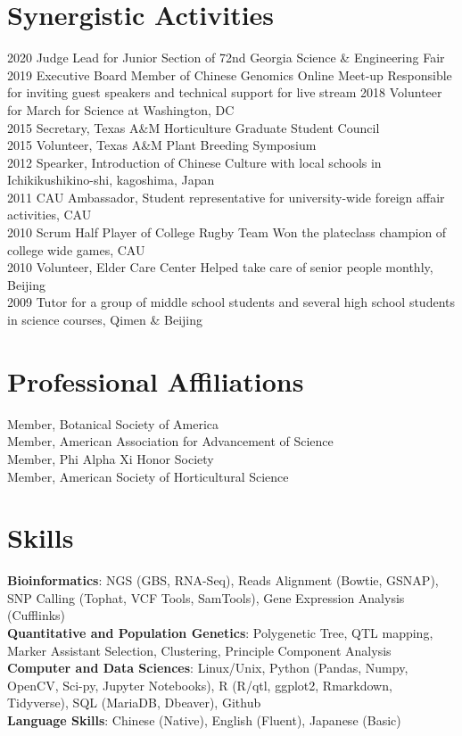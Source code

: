\documentclass[11pt, a4paper]{awesome-cv}
\begin{document}
\section{Synergistic Activities}\label{synergistic-activities}

2020 Judge Lead for Junior Section of 72nd Georgia Science \&
Engineering Fair\\
2019 Executive Board Member of Chinese Genomics Online Meet-up
\textbar{} Responsible for inviting guest speakers and technical support
for live stream 2018 Volunteer for March for Science at Washington, DC\\
2015 Secretary, Texas A\&M Horticulture Graduate Student Council\\
2015 Volunteer, Texas A\&M Plant Breeding Symposium\\
2012 Spearker, Introduction of Chinese Culture with local schools in
Ichikikushikino-shi, kagoshima, Japan\\
2011 CAU Ambassador, Student representative for university-wide foreign
affair activities, CAU\\
2010 Scrum Half Player of College Rugby Team \textbar{} Won the
plateclass champion of college wide games, CAU\\
2010 Volunteer, Elder Care Center \textbar{} Helped take care of senior
people monthly, Beijing\\
2009 Tutor for a group of middle school students and several high school
students in science courses, Qimen \& Beijing

\section{Professional Affiliations}\label{professional-affiliations}

Member, Botanical Society of America\\
Member, American Association for Advancement of Science\\
Member, Phi Alpha Xi Honor Society\\
Member, American Society of Horticultural Science

\section{Skills}\label{skills}

\textbf{Bioinformatics}: NGS (GBS, RNA-Seq), Reads Alignment (Bowtie,
GSNAP), SNP Calling (Tophat, VCF Tools, SamTools), Gene Expression
Analysis (Cufflinks)\\
\textbf{Quantitative and Population Genetics}: Polygenetic Tree, QTL
mapping, Marker Assistant Selection, Clustering, Principle Component
Analysis\\
\textbf{Computer and Data Sciences}: Linux/Unix, Python (Pandas, Numpy,
OpenCV, Sci-py, Jupyter Notebooks), R (R/qtl, ggplot2, Rmarkdown,
Tidyverse), SQL (MariaDB, Dbeaver), Github\\
\textbf{Language Skills}: Chinese (Native), English (Fluent), Japanese
(Basic)
\end{document}
